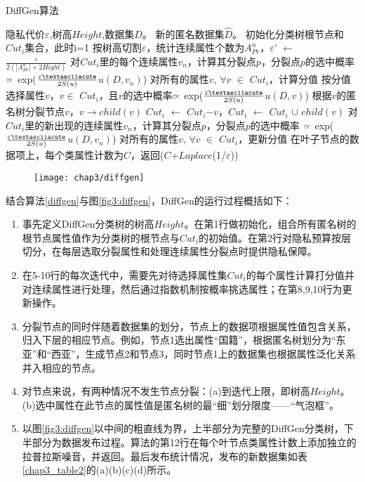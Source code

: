 \begin{algorithm}
	\caption{DiffGen算法} 
	\label{diffgen}
	\begin{algorithmic}[1]
		\REQUIRE 隐私代价$\varepsilon$,树高$Height$,数据集$D$。
		\ENSURE 新的匿名数据集$\hat{D}$。
		\STATE 初始化分类树根节点和$Cut_{i}$集合，此时i=1
		\STATE 按树高切割$\varepsilon$，统计连续属性个数为$A_{Pr}^{n}$，$\varepsilon$' $\leftarrow$ $\frac{\varepsilon}{2(|A_{Pr}^{n}|+2Hight)}$
		\STATE 对$Cut_{i}$里的每个连续属性$v_{n}$，计算其分裂点$p$，分裂点$p$的选中概率 $\wasypropto$ exp($\frac{\varepsilon\textasciiacute}{2S(u)}$$u(D,v_{n})$)
		\STATE 对所有的属性$v$, $\forall$$v$ $\in$ $Cut_{i}$，计算分值
		\STATE 按分值选择属性$v$，$v$$\in$ $Cut_{i}$，且$v$的选中概率$\wasypropto$ exp($\frac{\varepsilon\textasciiacute}{2S(u)}$$u(D,v)$)
		\STATE 根据$v$的匿名树分裂节点$v$，$v$$\rightarrow$$child(v)$
		\STATE $Cut_{i}$ $\leftarrow$ $Cut_{i}$$ - $$v$，$Cut_{i}$ $\leftarrow$ $Cut_{i}$ $\cup$ $child(v)$
		\STATE 对$Cut_{i}$里的新出现的连续属性$v_{n}$，计算其分裂点$p$，分裂点$p$的选中概率 $\wasypropto$ exp($\frac{\varepsilon\textasciiacute}{2S(u)}$$u(D,v_{n})$)
		\STATE 对所有的属性$v$, $\forall$$v$ $\in$ $Cut_{i}$，更新分值
		\ENDFOR
		\RETURN 在叶子节点的数据项上，每个类属性计数为$C$，返回($C$+$\textit{Laplace}$(1/$\varepsilon$))
	\end{algorithmic}
\end{algorithm}


\begin{figure}[!htp]
	\centering
	\texttt{[image: chap3/diffgen]}
\end{figure}

结合算法\ref{diffgen}与图\ref{fig3:diffgen}，DiffGen的运行过程概括如下：

\begin{enumerate}
	\label{process}
	\item 事先定义DiffGen分类树的树高$Height$。在第1行做初始化，组合所有匿名树的根节点属性值作为分类树的根节点与$Cut_{i}$的初始值。在第2行对隐私预算按层切分，在每层选取分裂属性和处理连续属性分裂点时提供隐私保障。
	\item 在5-10行的每次迭代中，需要先对待选择属性集$Cut_{i}$的每个属性计算打分值并对连续属性进行处理，然后通过指数机制按概率挑选属性；在第8,9,10行为更新操作。
	\item 分裂节点的同时伴随着数据集的划分，节点上的数据项根据属性值包含关系，归入下层的相应节点。例如，节点1选出属性“国籍”，根据匿名树划分为“东亚”和“西亚”，生成节点2和节点3，同时节点1上的数据集也根据属性泛化关系并入相应的节点。
	\item 对节点来说，有两种情况不发生节点分裂：(a)到迭代上限，即树高$Height$。(b)选中属性在此节点的属性值是匿名树的最“细”划分限度——“气泡框”。
	\item 以图\ref{fig3:diffgen}以中间的粗直线为界，上半部分为完整的DiffGen分类树，下半部分为数据发布过程。算法的第12行在每个叶节点类属性计数上添加独立的拉普拉斯噪音，并返回。最后发布统计情况，发布的新数据集如表\ref{chap3_table2}的(a)(b)(c)(d)所示。
\end{enumerate}

